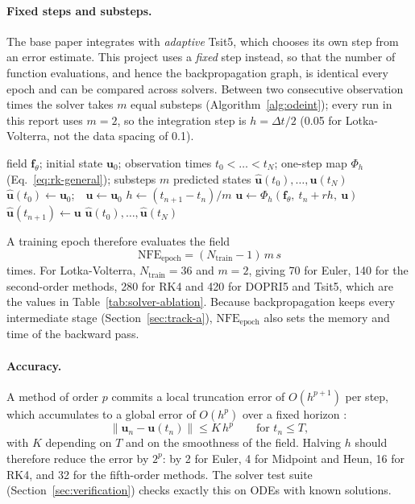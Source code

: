 \paragraph{Fixed steps and substeps.} The base paper integrates with
\emph{adaptive} Tsit5, which chooses its own step from an error estimate.
This project uses a \emph{fixed} step instead, so that the number of
function evaluations, and hence the backpropagation graph, is identical
every epoch and can be compared across solvers. Between two consecutive
observation times the solver takes $m$ equal substeps
(Algorithm~\ref{alg:odeint}); every run in this report uses $m=2$, so the
integration step is $h=\Delta t/2$ (0.05 for Lotka-Volterra, not the data
spacing of 0.1).

\begin{algorithm}[htbp]
\caption{Fixed-step trajectory integration with substeps.}
\label{alg:odeint}
\begin{algorithmic}[1]
\Require field $\mathbf f_\theta$; initial state $\mathbf u_0$; observation times $t_0<\dots<t_N$; one-step map $\Phi_h$ (Eq.~\ref{eq:rk-general}); substeps $m$
\Ensure predicted states $\hat{\mathbf u}(t_0),\dots,\hat{\mathbf u}(t_N)$
\State $\hat{\mathbf u}(t_0)\gets\mathbf u_0$;\ \ $\mathbf u\gets\mathbf u_0$
  \State $h\gets (t_{n+1}-t_n)/m$
    \State $\mathbf u\gets\Phi_h(\mathbf f_\theta,\ t_n+r h,\ \mathbf u)$ 
  \EndFor
  \State $\hat{\mathbf u}(t_{n+1})\gets\mathbf u$
\EndFor
\State \Return $\hat{\mathbf u}(t_0),\dots,\hat{\mathbf u}(t_N)$
\end{algorithmic}
\end{algorithm}

A training epoch therefore evaluates the field
\begin{equation}
\mathrm{NFE}_{\text{epoch}}=(N_{\text{train}}-1)\,m\,s
\label{eq:nfe}
\end{equation}
times. For Lotka-Volterra, $N_{\text{train}}=36$ and $m=2$, giving 70 for
Euler, 140 for the second-order methods, 280 for RK4 and 420 for DOPRI5 and
Tsit5, which are the values in Table~\ref{tab:solver-ablation}. Because
backpropagation keeps every intermediate stage (Section~\ref{sec:track-a}),
$\mathrm{NFE}_{\text{epoch}}$ also sets the memory and time of the backward
pass.

\paragraph{Accuracy.} A method of order $p$ commits a local truncation error
of $O(h^{p+1})$ per step, which accumulates to a global error of $O(h^{p})$
over a fixed horizon \cite{hairer1993solving}:
\begin{equation}
\big\lVert \mathbf u_n-\mathbf u(t_n)\big\rVert \le K\,h^{p}\qquad\text{for } t_n\le T,
\label{eq:global-error}
\end{equation}
with $K$ depending on $T$ and on the smoothness of the field. Halving $h$
should therefore reduce the error by $2^{p}$: by 2 for Euler, 4 for Midpoint
and Heun, 16 for RK4, and 32 for the fifth-order methods. The solver test
suite (Section~\ref{sec:verification}) checks exactly this on ODEs with known
solutions.

